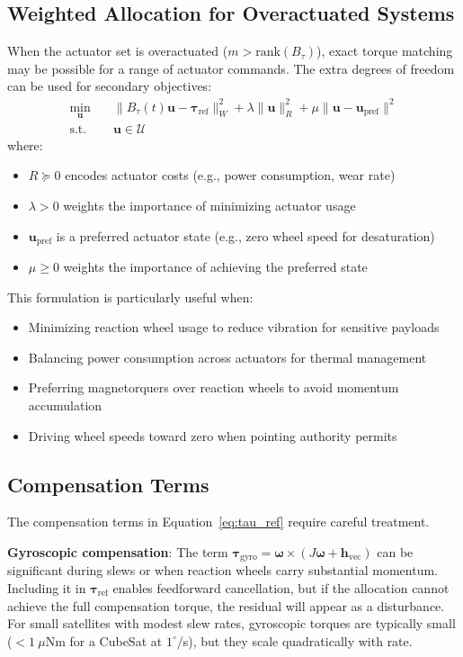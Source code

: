 \documentclass[conference]{IEEEtran}
\begin{document}
\subsection{Weighted Allocation for Overactuated Systems}
When the actuator set is overactuated ($m > \text{rank}(B_\tau)$), exact torque matching may be possible for a range of actuator commands. The extra degrees of freedom can be used for secondary objectives:
\begin{equation}
\begin{aligned}
\min_{\mathbf{u}} \quad & \|B_\tau(t) \mathbf{u} - \boldsymbol{\tau}_{\text{ref}}\|^2_W + \lambda \|\mathbf{u}\|^2_R + \mu \|\mathbf{u} - \mathbf{u}_{\text{pref}}\|^2 \\
\text{s.t.} \quad & \mathbf{u} \in \mathcal{U}
\end{aligned}
\label{eq:weighted_allocation}
\end{equation}
where:
\begin{itemize}
    \item $R \succeq 0$ encodes actuator costs (e.g., power consumption, wear rate)
    \item $\lambda > 0$ weights the importance of minimizing actuator usage
    \item $\mathbf{u}_{\text{pref}}$ is a preferred actuator state (e.g., zero wheel speed for desaturation)
    \item $\mu \geq 0$ weights the importance of achieving the preferred state
\end{itemize}

This formulation is particularly useful when:
\begin{itemize}
    \item Minimizing reaction wheel usage to reduce vibration for sensitive payloads
    \item Balancing power consumption across actuators for thermal management
    \item Preferring magnetorquers over reaction wheels to avoid momentum accumulation
    \item Driving wheel speeds toward zero when pointing authority permits
\end{itemize}

\subsection{Compensation Terms}
The compensation terms in Equation~\ref{eq:tau_ref} require careful treatment.

\textbf{Gyroscopic compensation}: The term $\boldsymbol{\tau}_{\text{gyro}} = \boldsymbol{\omega} \times (J\boldsymbol{\omega} + \mathbf{h}_{\text{vec}})$ can be significant during slews or when reaction wheels carry substantial momentum. Including it in $\boldsymbol{\tau}_{\text{ref}}$ enables feedforward cancellation, but if the allocation cannot achieve the full compensation torque, the residual will appear as a disturbance. For small satellites with modest slew rates, gyroscopic torques are typically small ($<1~\mu$Nm for a CubeSat at $1^\circ$/s), but they scale quadratically with rate.
\end{document}

